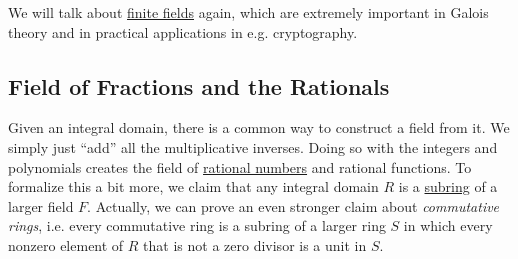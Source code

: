   We will talk about \hyperref[st-thm:finite-fields]{finite fields} again, which are extremely important in Galois theory and in practical applications in e.g. cryptography. 

\subsection{Field of Fractions and the Rationals}

  Given an integral domain, there is a common way to construct a field from it. We simply just ``add'' all the multiplicative inverses. Doing so with the integers and polynomials creates the field of \hyperref[st-thm:rational-numbers]{rational numbers} and rational functions. To formalize this a bit more, we claim that any integral domain $R$ is a \hyperref[def:subring]{subring} of a larger field $F$. Actually, we can prove an even stronger claim about \textit{commutative rings}, i.e. every commutative ring is a subring of a larger ring $S$ in which every nonzero element of $R$ that is not a zero divisor is a unit in $S$. 

